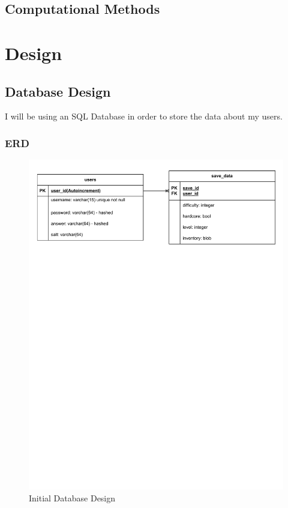\documentclass{article}
\begin{document}
        \subsection{Computational Methods}
\newpage
\pagestyle{plain}
\section{Design}
        \subsection{Database Design}
        I will be using an SQL Database in order to store the data about my users.\\
        \subsubsection{ERD}
        \begin{figure}[H]
                \centering
                \includegraphics[width=\textwidth, trim = 0 575 0 25, clip]{images/design/Database_Design.pdf}
                \caption{Initial Database Design}
                \label{fig:ie_1}
        \end{figure}
\end{document}
